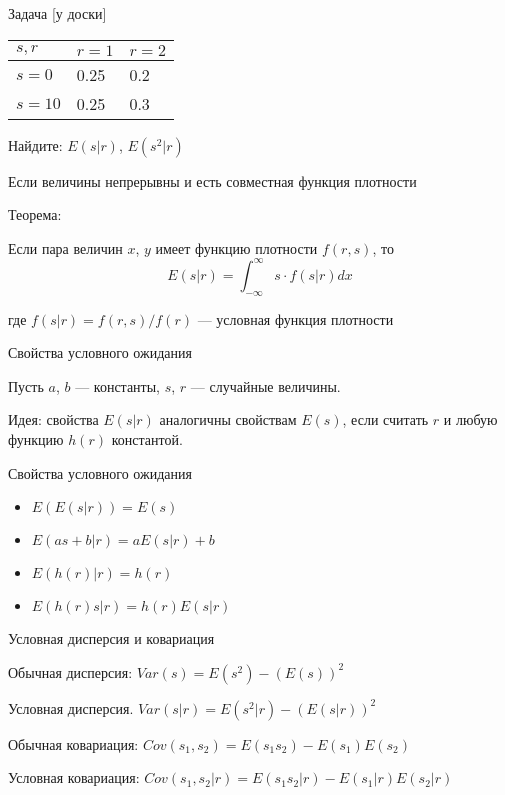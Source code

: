 \documentclass[ignorenonframetext,]{beamer}
\begin{document}
\begin{frame}{Задача {[}у доски{]}}

\begin{longtable}[c]{@{}lll@{}}
\toprule
\(s,r\) & \(r=1\) & \(r=2\)\tabularnewline
\midrule
\endhead
\(s=0\) & 0.25 & 0.2\tabularnewline
\(s=10\) & 0.25 & 0.3\tabularnewline
\bottomrule
\end{longtable}

Найдите: \(E(s|r)\), \(E(s^2|r)\)

\end{frame}

\begin{frame}{Если величины непрерывны и есть совместная функция
плотности}

Теорема:

Если пара величин \(x\), \(y\) имеет функцию плотности \(f(r,s)\), то \[
E(s|r)=\int_{-\infty}^{\infty} s \cdot f(s|r) dx
\]

где \(f(s|r)=f(r,s)/f(r)\) --- условная функция плотности

\end{frame}

\begin{frame}{Свойства условного ожидания}

Пусть \(a\), \(b\) --- константы, \(s\), \(r\) --- случайные величины.

Идея: свойства \(E(s|r)\) аналогичны свойствам \(E(s)\), если считать
\(r\) и любую функцию \(h(r)\) константой.

\end{frame}

\begin{frame}{Свойства условного ожидания}

\begin{itemize}
\item
  \(E(E(s|r))=E(s)\)
\item
  \(E(as+b|r)=aE(s|r)+b\)
\item
  \(E(h(r)|r)=h(r)\)
\item
  \(E(h(r)s|r)=h(r)E(s|r)\)
\end{itemize}

\end{frame}

\begin{frame}{Условная дисперсия и ковариация}

Обычная дисперсия: \(Var(s)=E(s^2)-(E(s))^2\)

Условная дисперсия. \(Var(s|r)=E(s^2|r)-(E(s|r))^2\)

Обычная ковариация: \(Cov(s_1,s_2)=E(s_1 s_2)-E(s_1)E(s_2)\)

Условная ковариация: \(Cov(s_1,s_2|r)=E(s_1 s_2|r)-E(s_1|r)E(s_2|r)\)

\end{frame}
\end{document}
